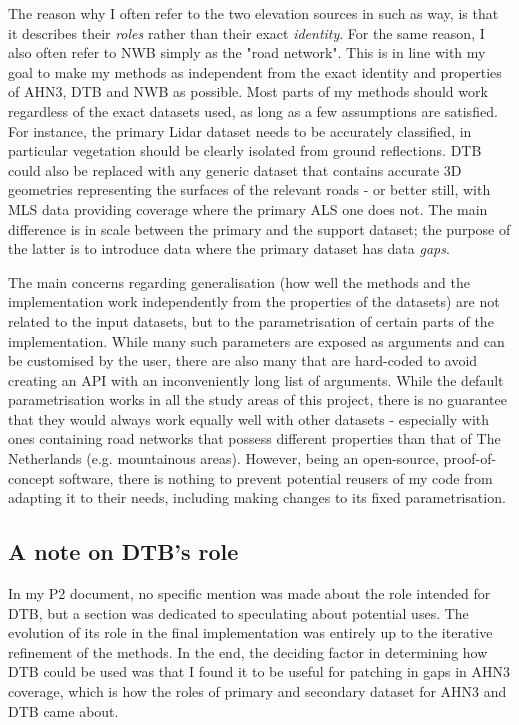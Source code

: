 The reason why I often refer to the two elevation sources in such as way, is that it describes their \textit{roles} rather than their exact \textit{identity}. For the same reason, I also often refer to NWB simply as the "road network". This is in line with my goal to make my methods as independent from the exact identity and properties of AHN3, DTB and NWB as possible. Most parts of my methods should work regardless of the exact datasets used, as long as a few assumptions are satisfied. For instance, the primary Lidar dataset needs to be accurately classified, in particular vegetation should be clearly isolated from ground reflections. DTB could also be replaced with any generic dataset that contains accurate 3D geometries representing the surfaces of the relevant roads - or better still, with MLS data providing coverage where the primary ALS one does not. The main difference is in scale between the primary and the support dataset; the purpose of the latter is to introduce data where the primary dataset has data \textit{gaps}.

The main concerns regarding generalisation (how well the methods and the implementation work independently from the properties of the datasets) are not related to the input datasets, but to the parametrisation of certain parts of the implementation. While many such parameters are exposed as arguments and can be customised by the user, there are also many that are hard-coded to avoid creating an API with an inconveniently long list of arguments. While the default parametrisation works in all the study areas of this project, there is no guarantee that they would always work equally well with other datasets - especially with ones containing road networks that possess different properties than that of The Netherlands (e.g. mountainous areas). However, being an open-source, proof-of-concept software, there is nothing to prevent potential reusers of my code from adapting it to their needs, including making changes to its fixed parametrisation.

\subsection{A note on DTB's role}
\label{sub:generalisation}

In my P2 document, no specific mention was made about the role intended for DTB, but a section was dedicated to speculating about potential uses. The evolution of its role in the final implementation was entirely up to the iterative refinement of the methods. In the end, the deciding factor in determining how DTB could be used was that I found it to be useful for patching in gaps in AHN3 coverage, which is how the roles of primary and secondary dataset for AHN3 and DTB came about.

